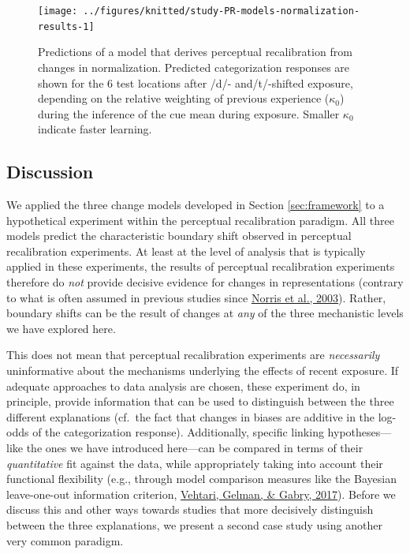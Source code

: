 \documentclass[
  11pt,
  man,floatsintext]{apa6}
\begin{document}
\begin{figure}

{\centering \texttt{[image: ../figures/knitted/study-PR-models-normalization-results-1]} 

}

\caption{Predictions of a model that derives perceptual recalibration from changes in normalization. Predicted categorization responses are shown for the 6 test locations after /d/- and/t/-shifted exposure, depending on the relative weighting of previous experience (\(\kappa_0\)) during the inference of the cue mean during exposure. Smaller \(\kappa_0\) indicate faster learning.}\label{fig:study-PR-models-normalization-results}
\end{figure}

\hypertarget{discussion}{%
\subsection{Discussion}\label{discussion}}

We applied the three change models developed in Section \ref{sec:framework} to a hypothetical experiment within the perceptual recalibration paradigm. All three models predict the characteristic boundary shift observed in perceptual recalibration experiments. At least at the level of analysis that is typically applied in these experiments, the results of perceptual recalibration experiments therefore do \emph{not} provide decisive evidence for changes in representations (contrary to what is often assumed in previous studies since \protect\hyperlink{ref-norris2003}{Norris et al., 2003}). Rather, boundary shifts can be the result of changes at \emph{any} of the three mechanistic levels we have explored here.

This does not mean that perceptual recalibration experiments are \emph{necessarily} uninformative about the mechanisms underlying the effects of recent exposure. If adequate approaches to data analysis are chosen, these experiment do, in principle, provide information that can be used to distinguish between the three different explanations (cf.~the fact that changes in biases are additive in the log-odds of the categorization response). Additionally, specific linking hypotheses---like the ones we have introduced here---can be compared in terms of their \emph{quantitative} fit against the data, while appropriately taking into account their functional flexibility (e.g., through model comparison measures like the Bayesian leave-one-out information criterion, \protect\hyperlink{ref-vehtari2017}{Vehtari, Gelman, \& Gabry, 2017}). Before we discuss this and other ways towards studies that more decisively distinguish between the three explanations, we present a second case study using another very common paradigm.
\end{document}
